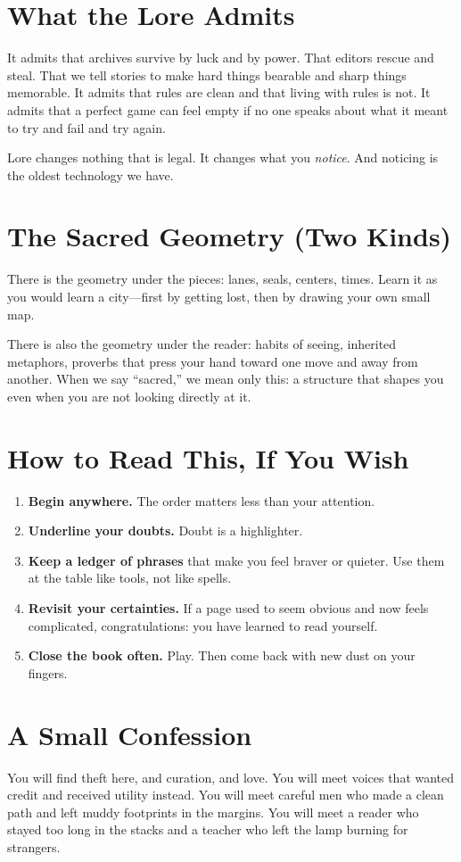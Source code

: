 \documentclass[11pt]{article}
\begin{document}
\section*{What the Lore Admits}
It admits that archives survive by luck and by power. That editors rescue and steal. That we tell stories to make hard things bearable and sharp things memorable. It admits that rules are clean and that living with rules is not. It admits that a perfect game can feel empty if no one speaks about what it meant to try and fail and try again.

Lore changes nothing that is legal. It changes what you \emph{notice}. And noticing is the oldest technology we have.

\section*{The Sacred Geometry (Two Kinds)}
There is the geometry under the pieces: lanes, seals, centers, times. Learn it as you would learn a city---first by getting lost, then by drawing your own small map.

There is also the geometry under the reader: habits of seeing, inherited metaphors, proverbs that press your hand toward one move and away from another. When we say ``sacred,'' we mean only this: a structure that shapes you even when you are not looking directly at it.

\section*{How to Read This, If You Wish}
\begin{enumerate}[leftmargin=*]
  \item \textbf{Begin anywhere.} The order matters less than your attention.
  \item \textbf{Underline your doubts.} Doubt is a highlighter.
  \item \textbf{Keep a ledger of phrases} that make you feel braver or quieter. Use them at the table like tools, not like spells.
  \item \textbf{Revisit your certainties.} If a page used to seem obvious and now feels complicated, congratulations: you have learned to read yourself.
  \item \textbf{Close the book often.} Play. Then come back with new dust on your fingers.
\end{enumerate}

\section*{A Small Confession}
You will find theft here, and curation, and love. You will meet voices that wanted credit and received utility instead. You will meet careful men who made a clean path and left muddy footprints in the margins. You will meet a reader who stayed too long in the stacks and a teacher who left the lamp burning for strangers.
\end{document}

